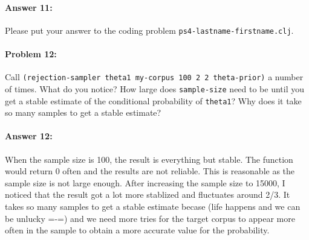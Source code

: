 \documentclass[10pt]{article}
\newcommand{\PSnum}{4}
\begin{document}
\paragraph{Answer 11:} Please put your answer to the coding problem
\texttt{ps\PSnum-lastname-firstname.clj}.

\paragraph{Problem 12:}

Call \texttt{(rejection-sampler theta1 my-corpus 100 2 2 theta-prior)}
a number of times. What do you notice? How large does
\texttt{sample-size} need to be until you get a stable estimate of the
conditional probability of \texttt{theta1}? Why does it take so many
samples to get a stable estimate?

\paragraph{Answer 12:} When the sample size is 100, the result is everything but stable. The function would return 0 often and the results are not reliable. This is reasonable as the sample size is not large enough. After increasing the sample size to 15000, I noticed that the result got a lot more stablized and fluctuates around 2/3. It takes so many samples to get a stable estimate becase (life happens and we can be unlucky =-=) and we need more tries for the target corpus to appear more often in the sample to obtain a more accurate value for the probability. 
\end{document}
